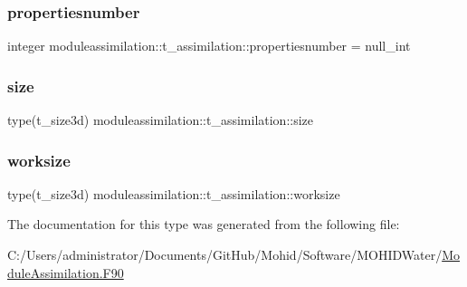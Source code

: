 \subsubsection{\texorpdfstring{propertiesnumber}{propertiesnumber}}
{\footnotesize\ttfamily integer moduleassimilation\+::t\+\_\+assimilation\+::propertiesnumber = null\+\_\+int\hspace{0.3cm}{\ttfamily [private]}}

\mbox{\label{structmoduleassimilation_1_1t__assimilation_a2f692ba76b1f31f17e872fabf4ab34b9}} 
\subsubsection{\texorpdfstring{size}{size}}
{\footnotesize\ttfamily type(t\+\_\+size3d) moduleassimilation\+::t\+\_\+assimilation\+::size\hspace{0.3cm}{\ttfamily [private]}}

\mbox{\label{structmoduleassimilation_1_1t__assimilation_aecb77a5309099cd24cc6fd85fd2a8bdf}} 
\subsubsection{\texorpdfstring{worksize}{worksize}}
{\footnotesize\ttfamily type(t\+\_\+size3d) moduleassimilation\+::t\+\_\+assimilation\+::worksize\hspace{0.3cm}{\ttfamily [private]}}



The documentation for this type was generated from the following file\+:\begin{DoxyCompactItemize}
\item 
C\+:/\+Users/administrator/\+Documents/\+Git\+Hub/\+Mohid/\+Software/\+M\+O\+H\+I\+D\+Water/\mbox{\hyperlink{_module_assimilation_8_f90}{Module\+Assimilation.\+F90}}\end{DoxyCompactItemize}
